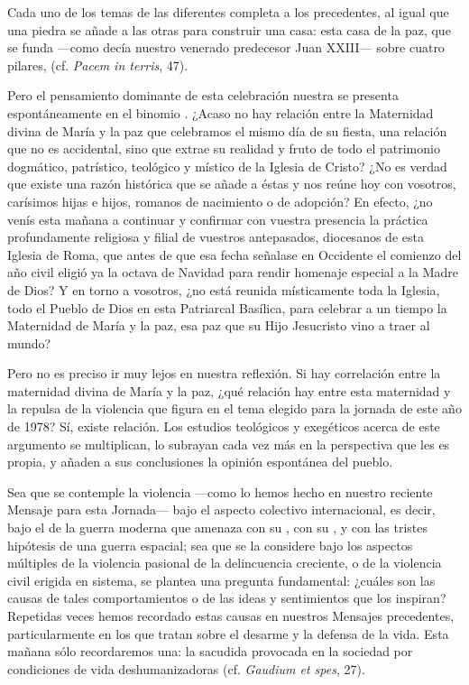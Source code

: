 \begin{body}
	Cada uno de los temas de las diferentes  completa a los precedentes, al igual que una piedra se añade a las otras para construir una casa: esta casa de la paz, que se funda ---como decía nuestro venerado predecesor Juan XXIII--- sobre cuatro pilares,  (cf. \emph{Pacem in terris}, 47).
	
	Pero el pensamiento dominante de esta celebración nuestra se presenta espontáneamente en el binomio . ¿Acaso no hay relación entre la Maternidad divina de María y la paz que celebramos el mismo día de su fiesta, una relación que no es accidental, sino que extrae su realidad y fruto de todo el patrimonio dogmático, patrístico, teológico y místico de la Iglesia de Cristo? ¿No es verdad que existe una razón histórica que se añade a éstas y nos reúne hoy con vosotros, carísimos hijas e hijos, romanos de nacimiento o de adopción? En efecto, ¿no venís esta mañana a continuar y confirmar con vuestra presencia la práctica profundamente religiosa y filial de vuestros antepasados, diocesanos de esta Iglesia de Roma, que antes de que esa fecha señalase en Occidente el comienzo del año civil eligió ya la octava de Navidad para rendir homenaje especial a la Madre de Dios? Y en torno a vosotros, ¿no está reunida místicamente toda la Iglesia, todo el Pueblo de Dios en esta Patriarcal Basílica, para celebrar a un tiempo la Maternidad de María y la paz, esa paz que su Hijo Jesucristo vino a traer al mundo?
	
	Pero no es preciso ir muy lejos en nuestra reflexión. Si hay correlación entre la maternidad divina de María y la paz, ¿qué relación hay entre esta maternidad y la repulsa de la violencia que figura en el tema elegido para la jornada de este año de 1978? Sí, existe relación. Los estudios teológicos y exegéticos acerca de este argumento se multiplican, lo subrayan cada vez más en la perspectiva que les es propia, y añaden a sus conclusiones la opinión espontánea del pueblo.
	
	Sea que se contemple la violencia ---como lo hemos hecho en nuestro reciente Mensaje para esta Jornada--- bajo el aspecto colectivo internacional, es decir, bajo el de la guerra moderna que amenaza con su , con su , y con las tristes hipótesis de una guerra espacial; sea que se la considere bajo los aspectos múltiples de la violencia pasional de la delincuencia creciente, o de la violencia civil erigida en sistema, se plantea una pregunta fundamental: ¿cuáles son las causas de tales comportamientos o de las ideas y sentimientos que los inspiran? Repetidas veces hemos recordado estas causas en nuestros Mensajes precedentes, particularmente en los que tratan sobre el desarme y la defensa de la vida. Esta mañana sólo recordaremos una: la sacudida provocada en la sociedad por condiciones de vida deshumanizadoras (cf. \emph{Gaudium et spes}, 27).
	

\end{body}
